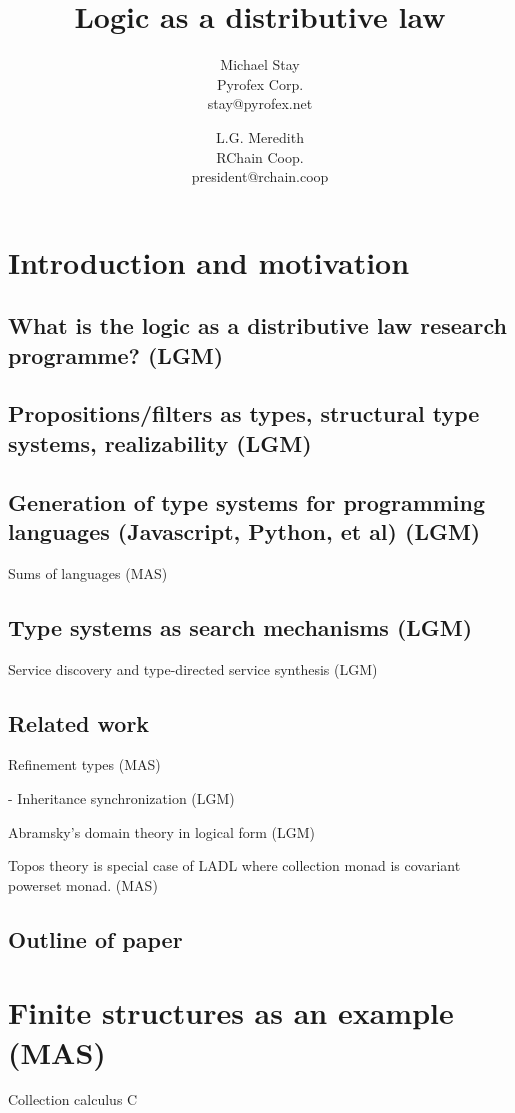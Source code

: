\documentclass{article}
\title{Logic as a distributive law}
\author{
Michael Stay\\
  {Pyrofex Corp.}\\
  {\fontsize{8}{8}\selectfont stay@pyrofex.net}\\
\and
L.G. Meredith\\
{RChain Coop.}\\
{\fontsize{8}{8}\selectfont president@rchain.coop}
}
\renewcommand{\:}{\colon}
\begin{document}
\maketitle

\begin{abstract}
\noindent
\end{abstract}

\section{Introduction and motivation}
\subsection{What is the logic as a distributive law research programme? (LGM)}
\subsection{Propositions/filters as types, structural type systems, realizability (LGM)}
\subsection{Generation of type systems for programming languages (Javascript, Python, et al) (LGM)}
  Sums of languages (MAS)
\subsection{Type systems as search mechanisms (LGM)}
  Service discovery and type-directed service synthesis (LGM)
\subsection{Related work}
  Refinement types (MAS)

  - Inheritance synchronization (LGM)

  Abramsky's domain theory in logical form (LGM)

  Topos theory is special case of LADL where collection monad is covariant powerset monad. (MAS)
\subsection{Outline of paper}

\section{Finite structures as an example (MAS)}
Collection calculus C
\end{document}
